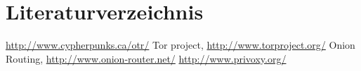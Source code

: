 \section{Literaturverzeichnis}
\begin{thebibliography}{666}
 \url{http://www.cypherpunks.ca/otr/}
 Tor project, \url{http://www.torproject.org/}
 Onion Routing, \url{http://www.onion-router.net/}
 \url{http://www.privoxy.org/}
\end{thebibliography}
